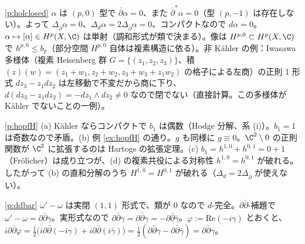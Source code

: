 \begin{sol}{\ref{p:holclosed}}
$\alpha$ は $(p,0)$ 型で $\bar\partial\alpha=0$、また $\bar\partial^*\alpha=0$（型 $(p,-1)$ は存在しない）。よって $\Delta_{\bar\partial}\alpha=0$、$\Delta_d\alpha=2\Delta_{\bar\partial}\alpha=0$、コンパクトなので $d\alpha=0$。$\alpha\mapsto[\alpha]\in H^p(X,\C)$ は単射（調和形式が類で決まる）。像は $H^{p,0}\subset H^p(X,\C)$ で $h^{p,0}\le b_p$（部分空間 $H^{p,0}$ 自体は複素構造に依る）。非 Kähler の例：Iwasawa 多様体（複素 Heisenberg 群 $G=\{(z_1,z_2,z_3)\}$、積 $(z)(w)=(z_1+w_1,z_2+w_2,z_3+w_3+z_1w_2)$ の格子による左商）の正則 1 形式 $dz_3-z_1dz_2$ は左移動で不変だから商に下り、$d(dz_3-z_1dz_2)=-dz_1\wedge dz_2\ne0$ なので閉でない（直接計算。この多様体が Kähler でないことの一例）。
\end{sol}
\begin{sol}{\ref{p:hopfH}}
(a) Kähler ならコンパクトで $b_1$ は偶数（Hodge 分解、系 (i)）。$b_1=1$ は奇数なので矛盾。(b) 例 \ref{ex:hopfH} の通り。$g$ も同様に $g\equiv0$。$\C^2\setminus0$ の正則関数が $\C^2$ に拡張するのは Hartogs の拡張定理。(c) $b_1=h^{1,0}+h^{0,1}=0+1$（Frölicher）は成り立つが、(d) の複素共役による対称性 $h^{1,0}=h^{0,1}$ が破れる。したがって (b) の直和分解のうち $\overline{H^{1,0}}=H^{0,1}$ が破れる（$\Delta_d=2\Delta_{\bar\partial}$ が使えない）。
\end{sol}
\begin{sol}{\ref{p:ddbar}}
$\omega'-\omega$ は実閉 $(1,1)$ 形式で、類が $0$ なので $d$-完全。$\partial\bar\partial$-補題で $\omega'-\omega=\partial\bar\partial\gamma$。実形式なので $\partial\bar\partial\gamma=\overline{\partial\bar\partial\gamma}=-\partial\bar\partial\bar\gamma$。$\varphi:=\mathrm{Re}(-i\gamma)$ とおくと、$i\partial\bar\partial\varphi=\frac12\big(i\partial\bar\partial(-i\gamma)+i\partial\bar\partial(i\bar\gamma)\big)=\frac12(\partial\bar\partial\gamma-\partial\bar\partial\bar\gamma)=\partial\bar\partial\gamma$。
\end{sol}

